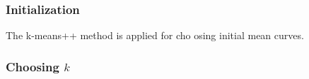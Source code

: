 		\subsubsection*{Initialization}
			The k-means++ method is applied for cho
osing initial mean curves.

		\subsubsection*{Choosing $k$}
			



		


		
			


